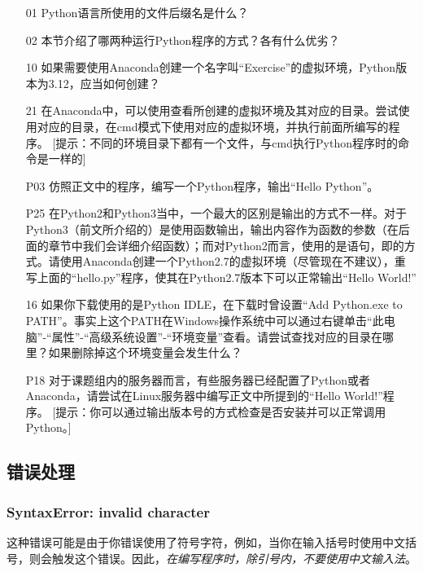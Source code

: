\begin{itemize}
    \item [01] Python语言所使用的文件后缀名是什么？
    \item [02] 本节介绍了哪两种运行Python程序的方式？各有什么优劣？
    \item [10] 如果需要使用Anaconda创建一个名字叫“Exercise”的虚拟环境，Python版本为3.12，应当如何创建？
    \item [21] 在Anaconda中，可以使用查看所创建的虚拟环境及其对应的目录。尝试使用对应的目录，在cmd模式下使用对应的虚拟环境，并执行前面所编写的程序。
    [提示：不同的环境目录下都有一个文件，与cmd执行Python程序时的命令是一样的]
    \item [P03] 仿照正文中的程序，编写一个Python程序，输出“Hello Python”。
    \item [P25] 在Python2和Python3当中，一个最大的区别是输出的方式不一样。对于Python3（前文所介绍的）是使用函数输出，输出内容作为函数的参数（在后面的章节中我们会详细介绍函数）；而对Python2而言，使用的是语句，即的方式。请使用Anaconda创建一个Python2.7的虚拟环境（尽管现在不建议），重写上面的“hello.py”程序，使其在Python2.7版本下可以正常输出“Hello World!”
    \item [16] 如果你下载使用的是Python IDLE，在下载时曾设置“Add Python.exe to PATH”。事实上这个PATH在Windows操作系统中可以通过右键单击“此电脑”-“属性”-“高级系统设置”-“环境变量”查看。请尝试查找对应的目录在哪里？如果删除掉这个环境变量会发生什么？
    \item [P18] 对于课题组内的服务器而言，有些服务器已经配置了Python或者Anaconda，请尝试在Linux服务器中编写正文中所提到的“Hello World!”程序。
    [提示：你可以通过输出版本号的方式检查是否安装并可以正常调用Python。]
\end{itemize}

\subsection{错误处理}\label{subsec:安装Python-错误处理}

\subsubsection{SyntaxError: invalid character}

这种错误可能是由于你错误使用了符号字符，例如，当你在输入括号时使用中文括号，则会触发这个错误。因此，\emph{在编写程序时，除引号内，不要使用中文输入法}。